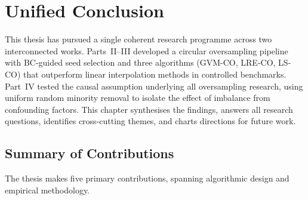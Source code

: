 
\chapter{Unified Conclusion}
\label{ch:conclusion}

This thesis has pursued a single coherent research programme across two interconnected works.
Parts~II--III developed a circular oversampling pipeline with BC-guided seed selection and three algorithms (GVM-CO, LRE-CO, LS-CO) that outperform linear interpolation methods in controlled benchmarks.
Part~IV tested the causal assumption underlying all oversampling research, using uniform random minority removal to isolate the effect of imbalance from confounding factors.
This chapter synthesises the findings, answers all research questions, identifies cross-cutting themes, and charts directions for future work.


\section{Summary of Contributions}
\label{sec:conc:contributions}

The thesis makes five primary contributions, spanning algorithmic design and empirical methodology.


